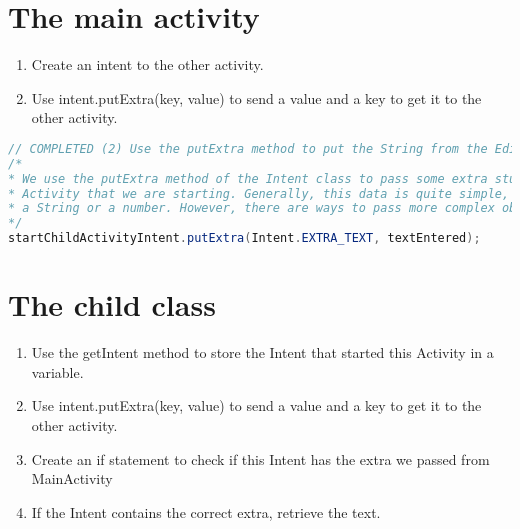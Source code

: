 \documentclass[12pt]{article} %
\begin{document}

\section{The main activity}

\begin{enumerate}
	\item Create an intent to the other activity.
	\item Use intent.putExtra(key, value) to send a value and a key to get it to the other activity.
\end{enumerate}

\begin{lstlisting}[language=Java]
// COMPLETED (2) Use the putExtra method to put the String from the EditText in the Intent
/*
* We use the putExtra method of the Intent class to pass some extra stuff to the
* Activity that we are starting. Generally, this data is quite simple, such as
* a String or a number. However, there are ways to pass more complex objects.
*/
startChildActivityIntent.putExtra(Intent.EXTRA_TEXT, textEntered);

\end{lstlisting}

\section{The child class}

\begin{enumerate}
	\item Use the getIntent method to store the Intent that started this Activity in a variable.
	\item Use intent.putExtra(key, value) to send a value and a key to get it to the other activity.
	\item  Create an if statement to check if this Intent has the extra we passed from MainActivity
	\item If the Intent contains the correct extra, retrieve the text.
\end{enumerate}
\end{document}
